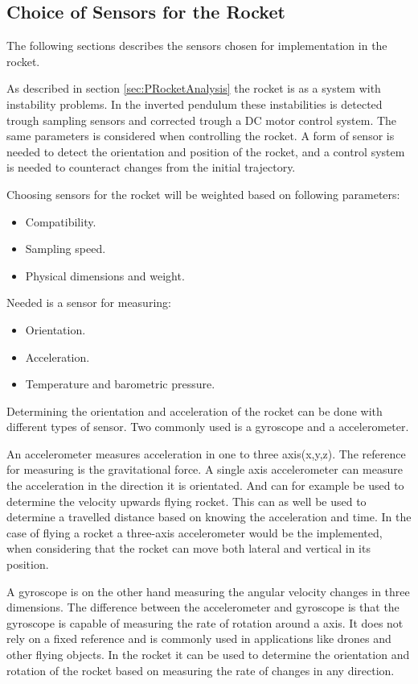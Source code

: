 \subsection{Choice of Sensors for the Rocket}
The following sections describes the sensors chosen for implementation in the rocket.  

As described in section \ref{sec:PRocketAnalysis} the rocket is as a system with instability problems. In the inverted pendulum these instabilities is detected trough sampling sensors and corrected trough a DC motor control system. The same parameters is considered when controlling the rocket. A form of sensor is needed to detect the orientation and position of the rocket, and a control system is needed to counteract changes from the initial trajectory.

Choosing sensors for the rocket will be weighted based on following parameters:

\begin{itemize}[noitemsep]
\item Compatibility.
\item Sampling speed.
\item Physical dimensions and weight.
\end{itemize}

Needed is a sensor for measuring:
\begin{itemize}[noitemsep]
\item Orientation.
\item Acceleration.
\item Temperature and barometric pressure.
\end{itemize}

Determining the orientation and acceleration of the rocket can be done with different types of sensor. Two commonly used is a gyroscope and a accelerometer. 


An accelerometer measures acceleration in one to three axis(x,y,z). The reference for measuring is the gravitational force. A single axis accelerometer can measure the acceleration in the direction it is orientated. And can for example be used to determine the velocity upwards flying rocket. This can as well be used to determine a travelled distance based on knowing the acceleration and time. In the case of flying a rocket a three-axis accelerometer would be the implemented, when considering that the rocket can move both lateral and vertical in its position.  


A gyroscope is on the other hand measuring the angular velocity changes in three dimensions. The difference between the accelerometer and gyroscope is that the gyroscope is capable of measuring the rate of rotation around a axis. It does not rely on a fixed reference and is commonly used in applications like drones and other flying objects. In the rocket it can be used to determine the orientation and rotation of the rocket based on measuring the rate of changes in any direction.  


